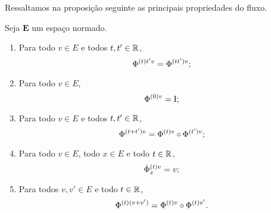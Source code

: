 Ressaltamos na proposição seguinte as principais propriedades do fluxo.

\begin{proposition}
Seja $\bm E$ um espaço normado.
	\begin{enumerate}
	\item Para todo $v \in E$ e todos $t,t' \in \R$,
		\begin{equation*}
		\flux{(t)}{t'v} = \flux{(tt')}{v};
		\end{equation*}
	\item Para todo $v \in E$,
		\begin{equation*}
		\flux{(0)}{v} = \Id;
		\end{equation*}
	\item Para todo $v \in E$ e todos $t,t' \in \R$,
		\begin{equation*}
		\flux{(t+t')}{v} = \flux{(t)}{v} \circ \flux{(t')}{v};
		\end{equation*}
	\item Para todo $v \in E$, todo $x \in E$ e todo $t \in \R$,
		\begin{equation*}
		\flux[\dot]{(t)}{v}_{x} = v;
		\end{equation*}
	\item Para todos $v,v' \in E$ e todo $t \in \R$,
		\begin{equation*}
		\flux{(t)}{(v+v')} = \flux{(t)}{v} \circ \flux{(t)}{v'}.
		\end{equation*}
	\end{enumerate}
\end{proposition}
